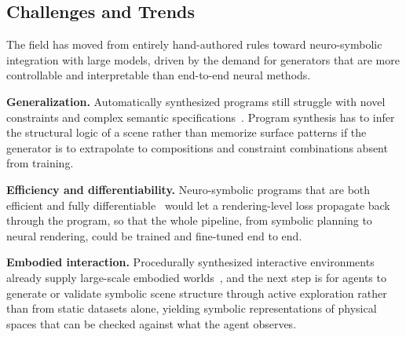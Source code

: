 \subsection{Challenges and Trends}
\label{subsubsec:p3_s8_7_challenges}

The field has moved from entirely hand-authored rules toward neuro-symbolic integration with large models, driven by the demand for generators that are more controllable and interpretable than end-to-end neural methods.

\textbf{Generalization.} Automatically synthesized programs still struggle with novel constraints and complex semantic specifications~\cite{mao2025neurosymbolicconcepts}. Program synthesis has to infer the structural logic of a scene rather than memorize surface patterns if the generator is to extrapolate to compositions and constraint combinations absent from training.

\textbf{Efficiency and differentiability.} Neuro-symbolic programs that are both efficient and fully differentiable~\cite{guo2023efficientsymbolicpolicy} would let a rendering-level loss propagate back through the program, so that the whole pipeline, from symbolic planning to neural rendering, could be trained and fine-tuned end to end.

\textbf{Embodied interaction.} Procedurally synthesized interactive environments already supply large-scale embodied worlds~\cite{kolve2017ai2thor, procthor, wang2024pipeline}, and the next step is for agents to generate or validate symbolic scene structure through active exploration rather than from static datasets alone, yielding symbolic representations of physical spaces that can be checked against what the agent observes.
